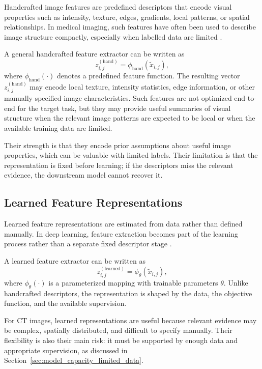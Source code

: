 Handcrafted image features are predefined descriptors that encode visual properties such as intensity, texture, edges, gradients, local patterns, or spatial relationships. In medical imaging, such features have often been used to describe image structure compactly, especially when labelled data are limited \cite{castellano2004texture,rizzo2018radiomics}.

A general handcrafted feature extractor can be written as
\[
z_{i,j}^{(\mathrm{hand})} = \phi_{\mathrm{hand}}(\tilde{x}_{i,j}),
\]
where \(\phi_{\mathrm{hand}}(\cdot)\) denotes a predefined feature function. The resulting vector \(z_{i,j}^{(\mathrm{hand})}\) may encode local texture, intensity statistics, edge information, or other manually specified image characteristics. Such features are not optimized end-to-end for the target task, but they may provide useful summaries of visual structure when the relevant image patterns are expected to be local or when the available training data are limited.

Their strength is that they encode prior assumptions about useful image properties, which can be valuable with limited labels. Their limitation is that the representation is fixed before learning; if the descriptors miss the relevant evidence, the downstream model cannot recover it.



\subsection{Learned Feature Representations}
\label{sec:learned_feature_representations}

Learned feature representations are estimated from data rather than defined manually. In deep learning, feature extraction becomes part of the learning process rather than a separate fixed descriptor stage \cite{lecun1998gradient,litjens2017survey}.

A learned feature extractor can be written as
\[
z_{i,j}^{(\mathrm{learned})} = \phi_{\theta}(\tilde{x}_{i,j}),
\]
where \(\phi_{\theta}(\cdot)\) is a parameterized mapping with trainable parameters \(\theta\). Unlike handcrafted descriptors, the representation is shaped by the data, the objective function, and the available supervision.

For CT images, learned representations are useful because relevant evidence may be complex, spatially distributed, and difficult to specify manually. Their flexibility is also their main risk: it must be supported by enough data and appropriate supervision, as discussed in Section~\ref{sec:model_capacity_limited_data}.




